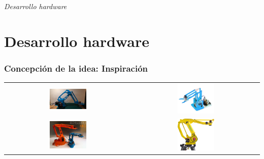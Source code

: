 \documentclass{beamer}
\begin{document}
\section*{}
\begin{frame}{}
  \centering \Huge
  \emph{Desarrollo hardware}
\end{frame}
\section{Desarrollo hardware}

\begin{frame}
  \frametitle{Concepción de la idea: Inspiración}
  \begin{table}[htbp]
    \centering
    \begin{tabular}{cc}
        \includegraphics[width=0.3\textwidth, valign=m]{figs/robotarmMK2plus.jpg} & \includegraphics[width=0.3\textwidth, valign=m]{figs/mearm.jpg} 
         \\ \includegraphics[width=0.3\textwidth, valign=m]{figs/mearms.jpg} & \includegraphics[width=0.3\textwidth, valign=m]{figs/fanuc.png} 
        
    \end{tabular}
  \end{table} 
\end{frame}
\end{document}
